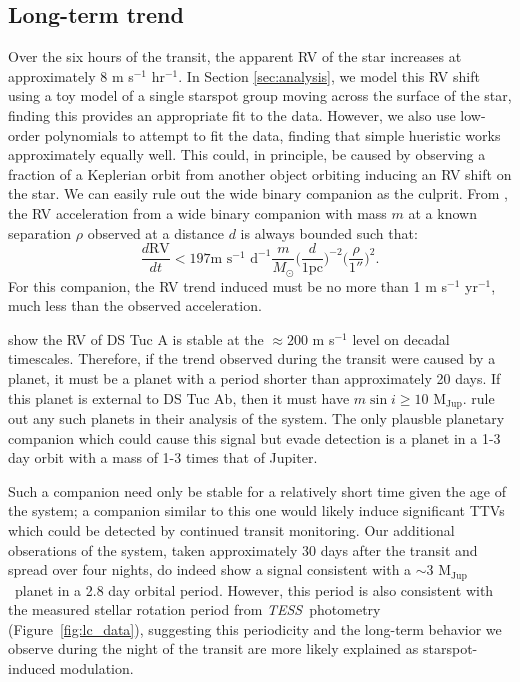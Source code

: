 \documentclass[twocolumn]{aastex63}
\newcommand{\tess}{{\it TESS}}
\newcommand{\mjup}{{M$_\textrm{Jup}$}}
\begin{document}
\subsection{Long-term trend}
\label{sec:trend}

Over the six hours of the transit, the apparent RV of the star increases at approximately 8 m s$^{-1}$ hr$^{-1}$. 
In Section \ref{sec:analysis}, we model this RV shift using a toy model of a single 
starspot group moving across the surface of the star, finding this provides an appropriate fit to the data. 
However, we also use low-order polynomials to attempt to fit the data, finding that simple hueristic works approximately equally well.
This could, in principle, be caused by observing a fraction of a Keplerian orbit from another object orbiting inducing an RV shift on the star. 
We can easily rule out the wide binary companion as the culprit.
From \citet{Liu02}, the RV acceleration from a wide binary companion with mass $m$ at a known separation $\rho$ observed at a distance $d$ is always bounded such that:
\begin{equation}
    \frac{d\textrm{RV}}{dt} < 197 \textrm{m } \textrm{s}^{-1} \textrm{ d}^{-1}
    \frac{m}{M_\odot} \bigg(\frac{d}{1\textrm{pc}}\bigg)^{-2} \bigg(\frac{\rho}{1''}\bigg)^{2}.
\end{equation}
For this companion, the RV trend induced must be no more than 1 m s$^{-1}$ yr$^{-1}$, much less than the observed acceleration.

\citet{Benatti19} show the RV of DS Tuc A is stable at the $\approx 200$ m s$^{-1}$ level on decadal timescales. 
Therefore, if the trend observed during the transit were caused by a planet, it must be a planet with a period shorter than approximately 20 days. 
If this planet is external to DS Tuc Ab, then it must have $m \sin i \geq 10$ \mjup. 
\citet{Benatti19} rule out any such planets in their analysis of the system.
The only plausble planetary companion which could cause this signal but evade detection is a planet in a 1-3 day orbit with a mass of 1-3 times that of Jupiter. 

Such a companion need only be stable for a relatively short time given the age of the system; a companion similar to this one would likely induce significant TTVs which could be detected by continued transit monitoring.
Our additional obserations of the system, taken approximately 30 days after the transit and spread over four nights, do indeed show a signal consistent with a $\sim 3$ \mjup\ planet in a 2.8 day orbital period. However, this period is also consistent with the measured stellar rotation period from \tess\ photometry (Figure~\ref{fig:lc_data}), suggesting this periodicity and the long-term behavior we observe during the night of the transit are more likely explained as starspot-induced modulation.
\end{document}
